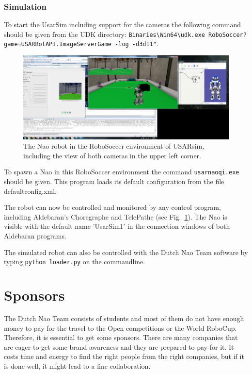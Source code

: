 \documentclass[11pt,a4paper,oneside]{article}
\begin{document}
\subsubsection{Simulation}
To start the UsarSim including support for the cameras the following command should be given from the UDK directory: \texttt{Binaries\textbackslash Win64\textbackslash udk.exe RoboSoccer?game=USARBotAPI.ImageServerGame -log -d3d11"}.

\begin{figure}[htb]        
\centering\includegraphics[width=.95\columnwidth]{NaoWithTwoCamerasInSoccerWorld.png}
\caption{The  Nao robot in the RoboSoccer environment of USARsim, including the view of both cameras in the upper left corner.}\label{fig:nao_robosoccer}
\end{figure}

To spawn a Nao in this RoboSoccer environment the command \texttt{usarnaoqi.exe} should be given. This program loads its default configuration from the file defaultconfig.xml.

The robot can now be controlled and monitored by any control program, including Aldebaran's Choregraphe and TelePathe (see Fig.~\ref{fig:nao_robosoccer}). The Nao is visible with the default name 'UsarSim1' in the connection windows of both Aldebaran programs.

The simulated robot can also be controlled with the Dutch Nao Team software by typing \texttt{python loader.py} on the commandline.

\section{Sponsors}
The Dutch Nao Team consists of students and most of them do not have enough money to pay for the travel to the Open competitions or the World RoboCup. Therefore, it is essential to get some sponsors. There are many companies that are eager to get some brand awareness and they are prepared to pay for it. It costs time and energy to find the right people from the right companies, but if it is done well, it might lead to a fine collaboration.
\end{document}
